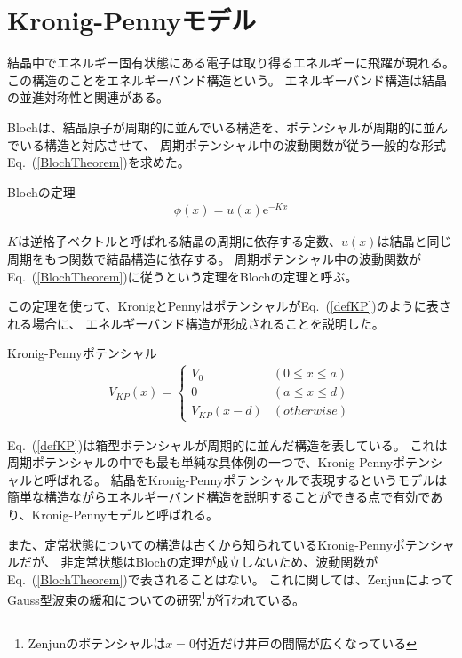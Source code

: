 \documentclass[autodetect-engine,dvipdfmx-if-dvi,ja=standard,a4paper,layout=v2]{bxjsreport}
\newcommand{\eref}[1]{Eq.~(\ref{#1})}
\begin{document}
    \section{Kronig-Pennyモデル}
    結晶中でエネルギー固有状態にある電子は取り得るエネルギーに飛躍が現れる。
    この構造のことをエネルギーバンド構造という。
    エネルギーバンド構造は結晶の並進対称性と関連がある。\par
    Blochは、結晶原子が周期的に並んでいる構造を、ポテンシャルが周期的に並んでいる構造と対応させて、
    周期ポテンシャル中の波動関数が従う一般的な形式\eref{BlochTheorem}を求めた。
    \begin{itembox}[l]{Blochの定理}
      \begin{align}
        \phi(x) = u(x) \mathrm{e}^{-K x} \label{BlochTheorem}
      \end{align}
    \end{itembox}
    $K$は逆格子ベクトルと呼ばれる結晶の周期に依存する定数、$u(x)$は結晶と同じ周期をもつ関数で結晶構造に依存する。
    周期ポテンシャル中の波動関数が\eref{BlochTheorem}に従うという定理をBlochの定理と呼ぶ。\par
    この定理を使って、KronigとPennyはポテンシャルが\eref{defKP}のように表される場合に、
    エネルギーバンド構造が形成されることを説明した。
    \begin{itembox}[l]{Kronig-Pennyポテンシャル}
    \begin{align}
        V_{KP}(x) =
        \begin{cases}
          V_0  & (0 \leq x \leq a)\\
          0    & (a \leq x \leq d)\\
          V_{KP}(x - d) & (otherwise)
        \end{cases}\label{defKP}
      \end{align}
    \end{itembox}
    \eref{defKP}は箱型ポテンシャルが周期的に並んだ構造を表している。
    これは周期ポテンシャルの中でも最も単純な具体例の一つで、Kronig-Pennyポテンシャルと呼ばれる。
    結晶をKronig-Pennyポテンシャルで表現するというモデルは
    簡単な構造ながらエネルギーバンド構造を説明することができる点で有効であり、Kronig-Pennyモデルと呼ばれる。\par
    また、定常状態についての構造は古くから知られているKronig-Pennyポテンシャルだが、
    非定常状態はBlochの定理が成立しないため、波動関数が\eref{BlochTheorem}で表されることはない。
    これに関しては、ZenjunによってGauss型波束の緩和についての研究\footnote{
      Zenjunのポテンシャルは$x=0$付近だけ井戸の間隔が広くなっている
    }が行われている。
\end{document}
